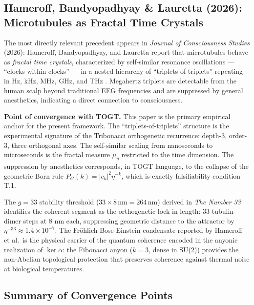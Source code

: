 \documentclass[11pt,a4paper]{article}
\theoremstyle{definition}
\theoremstyle{remark}
\begin{document}
\subsection{Hameroff, Bandyopadhyay \& Lauretta (2026): Microtubules as Fractal Time Crystals}

The most directly relevant precedent appears in \textit{Journal of Consciousness Studies}
(2026): Hameroff, Bandyopadhyay, and Lauretta report that microtubules behave as
\emph{fractal time crystals}, characterized by self-similar resonance oscillations ---
``clocks within clocks'' --- in a nested hierarchy of ``triplets-of-triplets'' repeating in
Hz, kHz, MHz, GHz, and THz \cite{HameroffBandyopadhyay2026}. Megahertz triplets are
detectable from the human scalp beyond traditional EEG frequencies and are suppressed by
general anesthetics, indicating a direct connection to consciousness.

\textbf{Point of convergence with TOGT.} This paper is the primary empirical anchor for the
present framework. The ``triplets-of-triplets'' structure is the experimental signature of the
Tribonacci orthogenetic recurrence: depth-3, order-3, three orthogonal axes. The self-similar
scaling from nanoseconds to microseconds is the fractal measure $\mu_\eta$ restricted to the
time dimension. The suppression by anesthetics corresponds, in TOGT language, to the collapse
of the geometric Born rule $P_G(k)=|c_k|^2\eta^{-k}$, which is exactly falsifiability
condition T.1.

The $g=33$ stability threshold ($33\times8\,\text{nm}=264\,\text{nm}$) derived in
\textit{The Number 33} \cite{Grossi2026-33} identifies the coherent segment as the orthogenetic
lock-in length: 33 tubulin-dimer steps at 8 nm each, suppressing geometric distance to the
attractor by $\eta^{-33}\approx1.4\times10^{-7}$. The Fr\"{o}hlich Bose-Einstein condensate
reported by Hameroff et al.\ is the physical carrier of the quantum coherence encoded in the
anyonic realization of $\ker\alpha$: the Fibonacci anyon ($k=3$, dense in SU(2)) provides the
non-Abelian topological protection that preserves coherence against thermal noise at biological
temperatures.

\subsection{Summary of Convergence Points}
\end{document}
